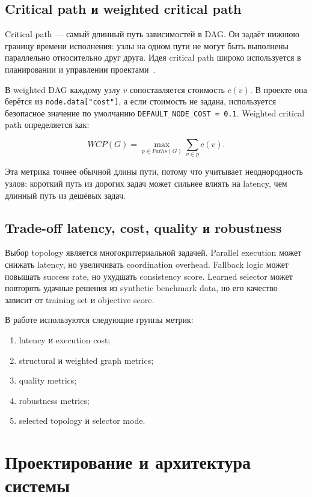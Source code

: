 \documentclass[12pt,a4paper]{report}
\newcommand{\code}[1]{\texttt{#1}}
\begin{document}
\section{Critical path и weighted critical path}

Critical path --- самый длинный путь зависимостей в DAG. Он задаёт нижнюю границу времени исполнения: узлы на одном пути не могут быть выполнены параллельно относительно друг друга. Идея critical path широко используется в планировании и управлении проектами~\cite{kerzner2017project}.

В weighted DAG каждому узлу \(v\) сопоставляется стоимость \(c(v)\). В проекте она берётся из \code{node.data["cost"]}, а если стоимость не задана, используется безопасное значение по умолчанию \code{DEFAULT\_NODE\_COST = 0.1}. Weighted critical path определяется как:

\[
WCP(G)=\max_{p \in Paths(G)} \sum_{v \in p} c(v).
\]

Эта метрика точнее обычной длины пути, потому что учитывает неоднородность узлов: короткий путь из дорогих задач может сильнее влиять на latency, чем длинный путь из дешёвых задач.

\section{Trade-off latency, cost, quality и robustness}

Выбор topology является многокритериальной задачей. Parallel execution может снижать latency, но увеличивать coordination overhead. Fallback logic может повышать success rate, но ухудшать consistency score. Learned selector может повторять удачные решения из synthetic benchmark data, но его качество зависит от training set и objective score.

В работе используются следующие группы метрик:
\begin{enumerate}
  \item latency и execution cost;
  \item structural и weighted graph metrics;
  \item quality metrics;
  \item robustness metrics;
  \item selected topology и selector mode.
\end{enumerate}

\chapter{Проектирование и архитектура системы}
\end{document}
